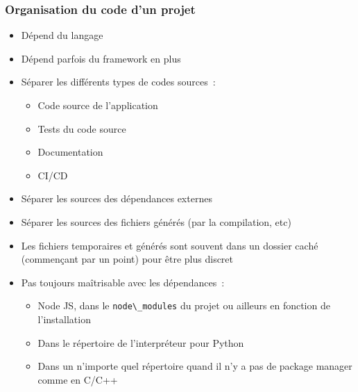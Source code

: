 \documentclass{beamer}
\begin{document}
    \begin{frame}
        \transdissolve
        \frametitle{Organisation du code d'un projet}

        \begin{itemize}

            \item Dépend du langage
            \item Dépend parfois du framework en plus
            \item Séparer les différents types de codes sources~:
            \begin{itemize}
                \item Code source de l'application
                \item Tests du code source
                \item Documentation
                \item CI/CD
            \end{itemize}
            \item Séparer les sources des dépendances externes
            \item Séparer les sources des fichiers générés (par la compilation, etc)
            \item Les fichiers temporaires et générés sont souvent dans un dossier caché (commençant par un point) pour être plus discret
            \item Pas toujours maîtrisable avec les dépendances~:
            \begin{itemize}
                \item Node JS, dans le \lstinline{node\_modules} du projet ou ailleurs en fonction de l'installation
                \item Dans le répertoire de l'interpréteur pour Python
                \item Dans un n'importe quel répertoire quand il n'y a pas de package manager comme en C/C++
            \end{itemize}

        \end{itemize}


    \end{frame}
\end{document}
